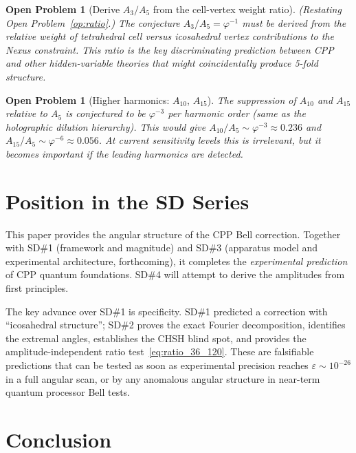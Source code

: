 \documentclass[11pt,letterpaper]{article}
\newtheorem{openprob}[theorem]{Open Problem}
\newcommand{\phig}{\varphi}
\newcommand{\eps}{\varepsilon}
\begin{document}
\begin{openprob}[Derive $A_3/A_5$ from the cell-vertex weight ratio]
(Restating Open Problem~\ref{op:ratio}.)
The conjecture $A_3/A_5 = \phig^{-1}$ must be derived from
the relative weight of tetrahedral cell versus icosahedral vertex
contributions to the Nexus constraint.  This ratio is the key
discriminating prediction between CPP and other hidden-variable
theories that might coincidentally produce 5-fold structure.
\end{openprob}

\begin{openprob}[Higher harmonics: $A_{10}$, $A_{15}$]
The suppression of $A_{10}$ and $A_{15}$ relative to $A_5$ is
conjectured to be $\phig^{-3}$ per harmonic order (same as the
holographic dilution hierarchy).  This would give $A_{10}/A_5 \sim
\phig^{-3} \approx 0.236$ and $A_{15}/A_5 \sim \phig^{-6} \approx
0.056$.  At current sensitivity levels this is irrelevant, but it
becomes important if the leading harmonics are detected.
\end{openprob}

\section{Position in the SD Series}

This paper provides the angular structure of the CPP Bell correction.
Together with SD\#1 (framework and magnitude) and SD\#3 (apparatus
model and experimental architecture, forthcoming), it completes the
\emph{experimental prediction} of CPP quantum foundations.  SD\#4
will attempt to derive the amplitudes from first principles.

The key advance over SD\#1 is specificity.  SD\#1 predicted a
correction with ``icosahedral structure''; SD\#2 proves the exact
Fourier decomposition, identifies the extremal angles, establishes
the CHSH blind spot, and provides the amplitude-independent ratio
test~\eqref{eq:ratio_36_120}.  These are falsifiable predictions
that can be tested as soon as experimental precision reaches
$\eps \sim 10^{-26}$ in a full angular scan, or by any anomalous
angular structure in near-term quantum processor Bell tests.

\section{Conclusion}
\end{document}
